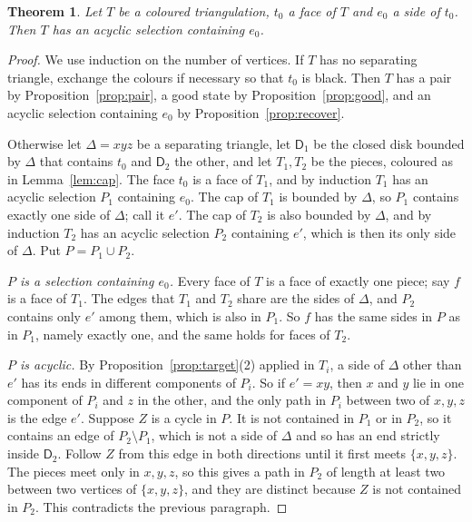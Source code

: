 \documentclass[10pt]{amsart}
\numberwithin{equation}{section}
\newtheorem{theorem}[equation]{Theorem}
\theoremstyle{definition}
\theoremstyle{remark}
\newcommand{\T}{T}
\begin{document}
\begin{theorem}\label{thm:T}
Let $\T$ be a coloured triangulation, $t_0$ a face of $\T$ and $e_0$ a side of $t_0$.
Then $\T$ has an acyclic selection containing $e_0$.
\end{theorem}

\begin{proof}
We use induction on the number of vertices.
If $\T$ has no separating triangle, exchange the colours if necessary so that $t_0$ is black.
Then $\T$ has a pair by Proposition~\ref{prop:pair}, a good state by Proposition~\ref{prop:good}, and an acyclic selection containing $e_0$ by Proposition~\ref{prop:recover}.

Otherwise let $\Delta=xyz$ be a separating triangle, let $\mathsf{D}_1$ be the closed disk bounded by $\Delta$ that contains $t_0$ and $\mathsf{D}_2$ the other, and let $\T_1,\T_2$ be the pieces, coloured as in Lemma~\ref{lem:cap}.
The face $t_0$ is a face of $\T_1$, and by induction $\T_1$ has an acyclic selection $P_1$ containing $e_0$.
The cap of $\T_1$ is bounded by $\Delta$, so $P_1$ contains exactly one side of $\Delta$; call it $e'$.
The cap of $\T_2$ is also bounded by $\Delta$, and by induction $\T_2$ has an acyclic selection $P_2$ containing $e'$, which is then its only side of $\Delta$.
Put $P=P_1\cup P_2$.

\emph{$P$ is a selection containing $e_0$.}
Every face of $\T$ is a face of exactly one piece; say $f$ is a face of $\T_1$.
The edges that $\T_1$ and $\T_2$ share are the sides of $\Delta$, and $P_2$ contains only $e'$ among them, which is also in $P_1$.
So $f$ has the same sides in $P$ as in $P_1$, namely exactly one, and the same holds for faces of $\T_2$.

\emph{$P$ is acyclic.}
By Proposition~\ref{prop:target}(2) applied in $\T_i$, a side of $\Delta$ other than $e'$ has its ends in different components of $P_i$.
So if $e'=xy$, then $x$ and $y$ lie in one component of $P_i$ and $z$ in the other, and the only path in $P_i$ between two of $x,y,z$ is the edge $e'$.
Suppose $Z$ is a cycle in $P$.
It is not contained in $P_1$ or in $P_2$, so it contains an edge of $P_2\setminus P_1$, which is not a side of $\Delta$ and so has an end strictly inside $\mathsf{D}_2$.
Follow $Z$ from this edge in both directions until it first meets $\{x,y,z\}$.
The pieces meet only in $x,y,z$, so this gives a path in $P_2$ of length at least two between two vertices of $\{x,y,z\}$, and they are distinct because $Z$ is not contained in $P_2$.
This contradicts the previous paragraph.
\end{proof}
\end{document}
